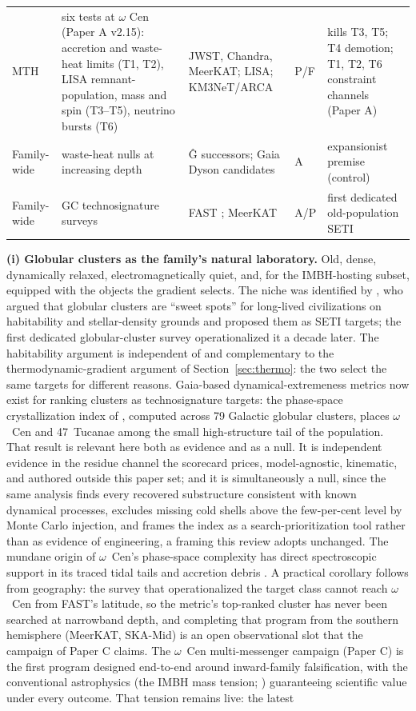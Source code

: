 \documentclass[11pt]{article}
\begin{document}
\begin{table}[tbp]
\begin{tabular}{p{2.4cm}p{3.4cm}p{2.8cm}p{1.9cm}p{2.9cm}}
MTH & six tests at $\omega$ Cen (Paper A v2.15): accretion and waste-heat limits (T1, T2), LISA remnant-population, mass and spin (T3--T5), neutrino bursts (T6) & JWST, Chandra, MeerKAT; LISA; KM3NeT/ARCA & P/F & kills T3, T5; T4 demotion; T1, T2, T6 constraint channels (Paper A) \\
Family-wide & waste-heat nulls at increasing depth & \^G successors; Gaia Dyson candidates & A & expansionist premise (control) \\
Family-wide & GC technosignature surveys & FAST \citep{Huang2026}; MeerKAT & A/P & first dedicated old-population SETI \\
\bottomrule
\end{tabular}
\end{table}

\textbf{(i) Globular clusters as the family's natural laboratory.} Old, dense, dynamically relaxed, electromagnetically quiet, and, for the IMBH-hosting subset, equipped with the objects the gradient selects. The niche was identified by \citet{DiStefano2016}, who argued that globular clusters are ``sweet spots'' for long-lived civilizations on habitability and stellar-density grounds and proposed them as SETI targets; the first dedicated globular-cluster survey \citep{Huang2026} operationalized it a decade later. The habitability argument is independent of and complementary to the thermodynamic-gradient argument of Section~\ref{sec:thermo}: the two select the same targets for different reasons. Gaia-based dynamical-extremeness metrics now exist for ranking clusters as technosignature targets: the phase-space crystallization index of \citet{Huang2026Crystallization}, computed across 79 Galactic globular clusters, places $\omega$~Cen and 47~Tucanae among the small high-structure tail of the population. That result is relevant here both as evidence and as a null. It is independent evidence in the residue channel the scorecard prices, model-agnostic, kinematic, and authored outside this paper set; and it is simultaneously a null, since the same analysis finds every recovered substructure consistent with known dynamical processes, excludes missing cold shells above the few-per-cent level by Monte Carlo injection, and frames the index as a search-prioritization tool rather than as evidence of engineering, a framing this review adopts unchanged. The mundane origin of $\omega$~Cen's phase-space complexity has direct spectroscopic support in its traced tidal tails and accretion debris \citep{Kuzma2026}. A practical corollary follows from geography: the survey that operationalized the target class \citep{Huang2026} cannot reach $\omega$~Cen from FAST's latitude, so the metric's top-ranked cluster has never been searched at narrowband depth, and completing that program from the southern hemisphere (MeerKAT, SKA-Mid) is an open observational slot that the campaign of Paper C claims. The $\omega$~Cen multi-messenger campaign (Paper C) is the first program designed end-to-end around inward-family falsification, with the conventional astrophysics (the IMBH mass tension; \citealt{Haberle2024Nature,BanaresHernandez2025}) guaranteeing scientific value under every outcome. That tension remains live: the latest 
\end{document}
